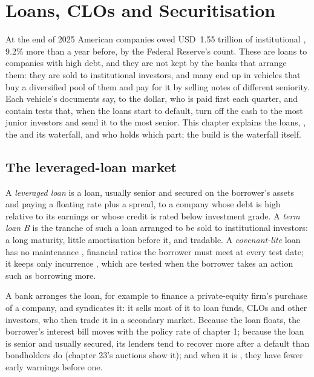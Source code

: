 \chapter{Loans, CLOs and Securitisation}\label{ch:m2:loans-clos-and-securitisation}

At the end of 2025 American companies owed USD~1.55 trillion of institutional , 9.2\% more than a year before, by the Federal Reserve's count. These are loans
to companies with high debt, and they are not kept by the banks that arrange them:
they are sold to institutional investors, and many end up in vehicles that buy a
diversified pool of them and pay for it by selling notes of different seniority. Each vehicle's documents say, to the dollar, who is paid first each
quarter, and contain tests that, when the loans start to default, turn off the cash to
the most junior investors and send it to the most senior. This chapter explains the
loans, , the  and its waterfall, and who
holds which part; the build is the waterfall itself.

\section{The leveraged-loan market}

\begin{definition}\label{def:m2:loans-clos-and-securitisation:loan}
A \emph{leveraged loan} is a loan, usually senior and secured on
the borrower's assets and paying a floating rate plus a spread, to a company whose
debt is high relative to its earnings or whose credit is rated below investment grade.
A \emph{term loan B} is the tranche of such a loan arranged to be
sold to institutional investors: a long maturity, little amortisation before it, and
tradable. A \emph{covenant-lite} loan has no maintenance
, financial ratios the borrower must meet at every test date; it keeps only
incurrence , which are tested when the borrower takes an action such as
borrowing more.
\end{definition}

A bank arranges the loan, for example to finance a private-equity firm's purchase of
a company, and syndicates it: it sells most of it to loan funds, CLOs and other
investors, who then trade it in a secondary market. Because the loan floats, the
borrower's interest bill moves with the policy rate of chapter 1; because the loan is
senior and usually secured, its lenders tend to recover more after a default than
bondholders do (chapter 23's auctions show it); and when it is , they
have fewer early warnings before one.

